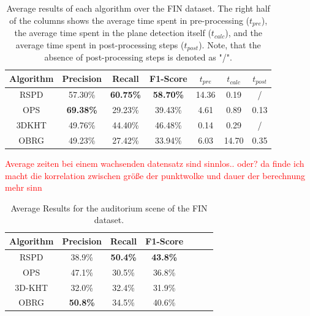 \documentclass[main.tex]{subfiles}
\begin{document}
\begin{table}[H]
    \centering
    \begin{tabular}{c|cccccc}
        Algorithm & Precision        & Recall           & F1-Score         & $t_{pre}$ & $t_{calc}$ & $t_{post}$ \\ \hline
        RSPD      & 57.30\%          & \textbf{60.75\%} & \textbf{58.70\%} & 14.36     & 0.19       & /          \\
        OPS       & \textbf{69.38\%} & 29.23\%          & 39.43\%          & 4.61      & 0.89       & 0.13       \\
        3DKHT     & 49.76\%          & 44.40\%          & 46.48\%          & 0.14      & 0.29       & /          \\
        OBRG      & 49.23\%          & 27.42\%          & 33.94\%          & 6.03      & 14.70      & 0.35
    \end{tabular}
    \caption[Overall 2D-3D-S Results]{Average results of each algorithm over the FIN dataset. The right half of the columns shows the average time spent in
        pre-processing ($t_{pre}$), the average time spent in the plane detection itself ($t_{calc}$), and the average time spent in post-processing steps ($t_{post}$).
        Note, that the absence of post-processing steps is denoted as "/".}
    \label{tab:res-fin-total}
\end{table}

\textcolor{red}{Average zeiten bei einem wachsenden datensatz sind sinnlos.. oder? da finde ich macht die korrelation zwischen größe
    der punktwolke und dauer der berechnung mehr sinn}


\begin{table}[]
    \centering
    \begin{tabular}{c|cccccc}
        Algorithm & Precision       & Recall          & F1-Score        \\ \hline
        RSPD      & 38.9\%          & \textbf{50.4\%} & \textbf{43.8\%} \\
        OPS       & 47.1\%          & 30.5\%          & 36.8\%          \\
        3D-KHT    & 32.0\%          & 32.4\%          & 31.9\%          \\
        OBRG      & \textbf{50.8\%} & 34.5\%          & 40.6\%
    \end{tabular}%
    \caption{Average Results for the auditorium scene of the FIN dataset.}
    \label{tab:res-fin-audi}
\end{table}
\end{document}
